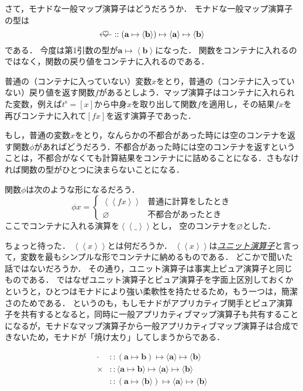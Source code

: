 \documentclass[a4paper,draft]{jsbook}
\newcommand{\keyword}[1]{{\underline{\emph{#1}}}}
\newcommand{\mList}[1]{{#1}^\mathrm{s}}
\newcommand{\mathTypeParameter}[1]{\mathbf{#1}}
\newcommand{\mathPureWith}[1]{\left\langle#1\right\rangle}
\newcommand{\mathUnitWith}[1]{\left\langle\!\left\langle#1\right\rangle\!\right\rangle}
\newcommand{\mathPureNothing}{\varnothing}
\newcommand{\mathAny}{\_}
\newcommand{\mathApplicativeGeneralMap}{\mathbin{\times}}
\newcommand{\mathBind}{\mathbin{\ooalign{$\longleftarrow$\crcr\hss$\heartsuit$\hss}}}
\newcommand{\mathGeneralMap}{\mathbin{\cdot}}
\newcommand{\mathIn}{\mathrel{::}}
\newcommand{\mathMapsTo}{\mapsto}
\newcommand{\mathMorph}[2]{#1\mathMapsTo#2}
\newcommand{\mathMorphII}[3]{#1\mathMapsTo#2\mathMapsTo#3}
\DeclareMathOperator{\hsklMonadMap}{{DO NOT USE}--\heartsuit}
\begin{document}
さて，モナドな一般マップ演算子はどうだろうか．
モナドな一般マップ演算子の型は
\begin{equation}
\mathBind
\mathIn{}\mathMorphII{(\mathMorph{\mathTypeParameter{a}}{\langle\mathTypeParameter{b}\rangle})}{\langle\mathTypeParameter{a}\rangle}{\langle{\mathTypeParameter{b}}\rangle}
\end{equation}
である．
今度は第1引数の型が$\mathTypeParameter{a}\mapsto\mathPureWith{\mathTypeParameter{b}}$になった．
関数をコンテナに入れるのではなく，関数の戻り値をコンテナに入れるのである．

普通の（コンテナに入っていない）変数$x$をとり，普通の（コンテナに入っていない）戻り値を返す関数$f$があるとしよう．マップ演算子はコンテナに入れられた変数，例えば$\mList{t}=[x]$から中身$x$を取り出して関数$f$を適用し，その結果$fx$を再びコンテナに入れて$[fx]$を返す演算子であった．

もし，普通の変数$x$をとり，なんらかの不都合があった時には空のコンテナを返す関数$\phi$があればどうだろう．不都合があった時には空のコンテナを返すということは，不都合がなくても計算結果をコンテナにに詰めることになる．さもなければ関数の型がひとつに決まらないことになる．

関数$\phi$は次のような形になるだろう．
$$\phi x=\begin{cases}\mathUnitWith{fx}&\text{普通に計算をしたとき}\\
\mathPureNothing&\text{不都合があったとき}\end{cases}$$
ここでコンテナに入れる演算を$\mathUnitWith{\mathAny}$とし，
空のコンテナを$\mathPureNothing$とした．

ちょっと待った．
$\mathUnitWith{x}$とは何だろうか．
$\mathUnitWith{x}$は\keyword{ユニット演算子}と言って，変数を最もシンプルな形でコンテナに納めるものである．
どこかで聞いた話ではないだろうか．
その通り，ユニット演算子は事実上ピュア演算子と同じものである．
ではなぜユニット演算子とピュア演算子を字面上区別しておくかというと，ひとつはモナドにより強い柔軟性を持たせるため，もう一つは，簡潔さのためである．
というのも，もしモナドがアプリカティブ関手とピュア演算子を共有するとなると，同時に一般アプリカティブマップ演算子も共有することになるが，モナドなマップ演算子から一般アプリカティブマップ演算子は合成できないため，モナドが「焼け太り」してしまうからである．

\begin{align*}
\mathGeneralMap&\mathIn{}\mathMorphII{(\mathMorph{\mathTypeParameter{a}}{\mathTypeParameter{b}})}{\langle\mathTypeParameter{a}\rangle}{\langle\mathTypeParameter{b}
\rangle}\\
\mathApplicativeGeneralMap&\mathIn{}\mathMorphII{\langle\mathMorph{\mathTypeParameter{a}}{\mathTypeParameter{b}}\rangle}{\langle\mathTypeParameter{a}\rangle}{\langle\mathTypeParameter{b}\rangle}\\
\hsklMonadMap&\mathIn{}\mathMorphII{(\mathMorph{\mathTypeParameter{a}}{\langle\mathTypeParameter{b}\rangle})}{\langle\mathTypeParameter{a}\rangle}{\langle{\mathTypeParameter{b}}\rangle}
\end{align*}
\end{document}
